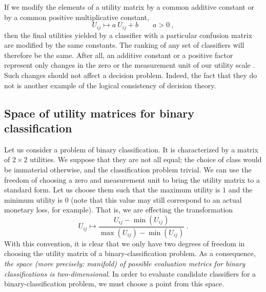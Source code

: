 \documentclass[\ifafour a4paper,12pt,\else a5paper,10pt,\fi%
onecolumn,oneside,article,%
british%
]{memoir}
\theoremstyle{remark}
\theoremstyle{innote}
\renewcommand*{\|}[1][]{\nonscript\:#1\vert\nonscript\:\mathopen{}}
\newcommand*{\sect}{\S}%
\begin{document}
If we modify the elements of a utility matrix by a common additive constant or by a common positive multiplicative constant,
\begin{equation}
  \label{eq:modify_UM}
  U_{ij} \mapsto a\ U_{ij} + b  \qquad a > 0 \ ,
\end{equation}
then the final utilities yielded by a classifier with a particular confusion matrix are modified by the same constants. The ranking of any set of classifiers will therefore be the same. After all, an additive constant or a positive factor represent only changes in the zero or the measurement unit of our utility scale \autocites[cf.][\sect~15.2.2]{russelletal1995_r2022}. Such changes should not affect a decision problem. Indeed, the fact that they do not is another example of the logical consistency of decision theory.

\subsection{Space of utility matrices for binary classification}
\label{sec:dt_space_util}

Let us consider a problem of binary classification. It is characterized by a matrix of $2 \times 2$ utilities. We suppose that they are not all equal;  the choice of class would be immaterial otherwise, and the classification problem trivial. We can use the freedom of choosing a zero and measurement unit to bring the utility matrix to a standard form. Let us choose them such that the maximum utility is $1$ and the minimum utility is $0$ (note that this value may still correspond to an actual monetary loss, for example). That is, we are effecting the transformation
\begin{equation}
  \label{eq:normalize_utilities}
  U_{ij} \mapsto \frac{U_{ij} - \min(U_{ij})}{\max(U_{ij}) - \min(U_{ij})} \ .
\end{equation}
With this convention, it is clear that we only have two degrees of freedom in choosing the utility matrix of a binary-classification problem. As a consequence, \emph{the space (more precisely: manifold) of possible evaluation metrics for binary classifications is two-dimensional}. In order to evaluate candidate classifiers for a binary-classification problem, we must choose a point from this space.
\end{document}
